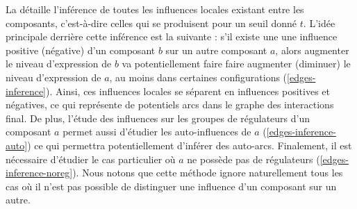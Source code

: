 La  détaille l'inférence de toutes les influences locales existant
entre les composants, c'est-à-dire celles qui se produisent pour un seuil donné $t$.
L'idée principale derrière cette inférence est la suivante :
s'il existe une une influence
positive (\resp négative) d'un composant $b$ sur un autre composant $a$,
alors augmenter le niveau d'expression de $b$
va potentiellement faire faire augmenter (\resp diminuer) le niveau d'expression de $a$,
au moins dans certaines configurations (\eqref{edges-inference}).
Ainsi, ces influences locales se séparent en influences positives et négatives,
ce qui représente de potentiels arcs dans le graphe des interactions final.
De plus, l'étude des influences sur les groupes de régulateurs d'un composant $a$
permet aussi d'étudier les auto-influences de $a$
(\eqref{edges-inference-auto})
ce qui permettra potentiellement d'inférer des auto-arcs.
Finalement, il est nécessaire d'étudier le cas particulier où $a$ ne possède pas de régulateurs
(\eqref{edges-inference-noreg}).
Nous notons que cette méthode ignore naturellement tous les cas où il n'est pas possible
de distinguer une influence d'un composant sur un autre.

